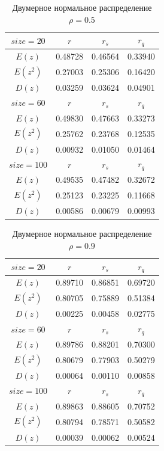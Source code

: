 \begin{table}[H]
	\begin{center}
		\begin{tabular}{|c||c|c|c|}
			\hline
			$size = 20$ & $r$ & $r_s$ & $r_q$ \\ 
			\hline 
			$E(z)$ & 0.48728 & 0.46564 & 0.33940 \\ 
			\hline 
			$E(z^2)$ & 0.27003 & 0.25306 & 0.16420 \\ 
			\hline 
			$D(z)$ & 0.03259 & 0.03624 & 0.04901 \\ 
			\hline \hline 
			$size = 60$ & $r$ & $r_s$ & $r_q$ \\ 
			\hline 
			$E(z)$ & 0.49830 & 0.47663 & 0.33273 \\ 
			\hline 
			$E(z^2)$ & 0.25762 & 0.23768 & 0.12535 \\ 
			\hline 
			$D(z)$ & 0.00932 & 0.01050 & 0.01464 \\ 
			\hline \hline 
			$size = 100$ & $r$ & $r_s$ & $r_q$ \\ 
			\hline 
			$E(z)$ & 0.49535 & 0.47482 & 0.32672 \\ 
			\hline 
			$E(z^2)$ & 0.25123 & 0.23225 & 0.11668 \\ 
			\hline 
			$D(z)$ & 0.00586 & 0.00679 & 0.00993 \\ 
			\hline 
		\end{tabular}
	\end{center}
	\caption{Двумерное нормальное распределение $\rho = 0.5$}
\end{table} 

\begin{table}[H]
	\begin{center}
		\begin{tabular}{|c||c|c|c|}
		\hline
		$size = 20$ & $r$ & $r_s$ & $r_q$ \\ 
		\hline 
		$E(z)$ & 0.89710 & 0.86851 & 0.69720 \\ 
		\hline 
		$E(z^2)$ & 0.80705 & 0.75889 & 0.51384 \\ 
		\hline 
		$D(z)$ & 0.00225 & 0.00458 & 0.02775 \\ 
		\hline \hline 
		$size = 60$ & $r$ & $r_s$ & $r_q$ \\ 
		\hline 
		$E(z)$ & 0.89786 & 0.88201 & 0.70300 \\ 
		\hline 
		$E(z^2)$ & 0.80679 & 0.77903 & 0.50279 \\ 
		\hline 
		$D(z)$ & 0.00064 & 0.00110 & 0.00858 \\ 
		\hline \hline 
		$size = 100$ & $r$ & $r_s$ & $r_q$ \\ 
		\hline 
		$E(z)$ & 0.89863 & 0.88605 & 0.70752 \\ 
		\hline 
		$E(z^2)$ & 0.80794 & 0.78571 & 0.50582 \\ 
		\hline 
		$D(z)$ & 0.00039 & 0.00062 & 0.00524 \\ 
		\hline 
		\end{tabular}
	\end{center}
	\caption{Двумерное нормальное распределение $\rho = 0.9$}
\end{table} 

